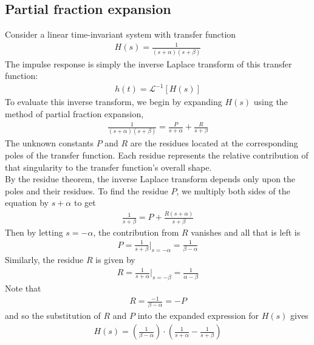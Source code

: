 \documentclass[11pt]{report}
\newcommand{\NI}{\noindent}
\begin{document}
	\subsection{Partial fraction expansion}
	Consider a linear time-invariant system with transfer function
	\begin{eqnarray*}
		H(s) = \frac{1}{(s + \alpha)(s + \beta)}
	\end{eqnarray*}
	The impulse response is simply the inverse Laplace transform of this transfer function:
	\begin{eqnarray*}
		h(t)=\mathcal {L}^{-1}[H(s)]
	\end{eqnarray*}
	To evaluate this inverse transform, we begin by expanding $H(s)$ using the method of partial fraction expansion,
	\begin{eqnarray*}
		\frac{1}{(s + \alpha)(s + \beta)} = \frac{P}{s + \alpha} + \frac{R}{s + \beta}
	\end{eqnarray*}
	The unknown constants $P$ and $R$ are the residues located at the corresponding poles of the transfer function. Each residue represents the relative contribution of that singularity to the transfer function's overall shape.\\
	
	\NI By the residue theorem, the inverse Laplace transform depends only upon the poles and their residues. To find the residue $P$, we multiply both sides of the equation by $s + \alpha$ to get
	\begin{eqnarray*}
		\frac{1}{s + \beta} = P + \frac{R(s + \alpha)}{s + \beta}
	\end{eqnarray*}
	Then by letting $s =-\alpha$, the contribution from $R$ vanishes and all that is left is 
	\begin{eqnarray*}
		P = \frac{1}{s + \beta}\Bigg|_{s=-\alpha} = \frac{1}{\beta - \alpha}
	\end{eqnarray*}
	Similarly, the residue $R$ is given by
	\begin{eqnarray*}
		R = \frac{1}{s + \alpha}\Bigg|_{s=-\beta} = \frac{1}{\alpha - \beta}
	\end{eqnarray*}
	Note that 
	\begin{eqnarray*}
		R = \frac{-1}{\beta - \alpha} = -P
	\end{eqnarray*}
	and so the substitution of $R$ and $P$ into the expanded expression for $H(s)$ gives
	\begin{eqnarray*}
		H(s) = (\frac{1}{\beta - \alpha}) \cdot \left(\frac{1}{s + \alpha} - \frac{1}{s + \beta}\right)
	\end{eqnarray*}
	
\end{document}
